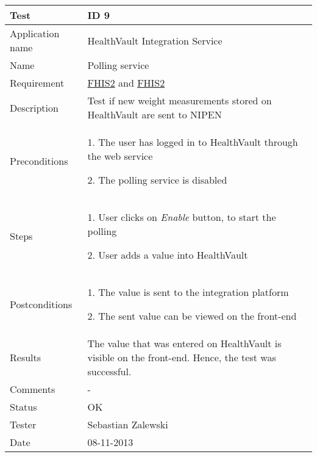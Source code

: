 \begin{table}
\begin{center}
\begin{tabular}{ | l | p{10cm} | }
	\hline
	\textbf{Test}	&	\textbf{ID 9} \\
	\hline\noalign{\smallskip}\noalign{\smallskip}\hline
	Application name	& HealthVault Integration Service \\
	Name				& Polling service \\
	Requirement			& \hyperref[table:reqwebservice]{FHIS2} and \hyperref[table:reqwebservice]{FHIS2} \\
	Description			& Test if new weight measurements stored on HealthVault are sent to NIPEN \\
	Preconditions		&	\par 1. The user has logged in to HealthVault through the web service
							\par 2. The polling service is disabled \\
	Steps 				&	\par 1. User clicks on \textit{Enable} button, to start the polling 
							\par 2. User adds a value into HealthVault \\
	Postconditions		&	\par 1. The value is sent to the integration platform
							\par 2. The sent value can be viewed on the front-end \\
	Results				& The value that was entered on HealthVault is visible on the front-end.
						  Hence, the test was successful. \\
	Comments			& - \\
	Status				& OK \\
	Tester				& Sebastian Zalewski \\
	Date				& 08-11-2013 \\
	\hline
\end{tabular}
\end{center}
\end{table}